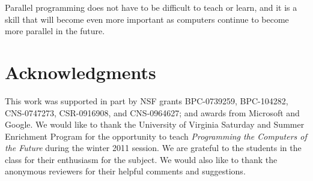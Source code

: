 \documentclass{sig-alternate}
\begin{document}
Parallel programming does not have to be difficult to teach or learn,
and it is a skill that will become even more important as computers continue to become more
parallel in the future.


\section*{Acknowledgments}
This work was supported in part by NSF grants BPC-0739259, BPC-104282, CNS-0747273, 
CSR-0916908, and CNS-0964627; 
and awards from Microsoft and Google. We would like to thank 
the University of Virginia Saturday and Summer Enrichment Program for the opportunity to
teach \emph{Programming the Computers of the Future} during the winter 2011 session.
We are grateful to the students in the class for their enthusiasm for the subject.  
We would also like to thank the anonymous reviewers for their helpful comments and suggestions.

%
{\small

}
%
%
\end{document}
